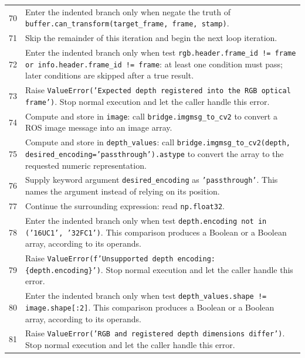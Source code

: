 \documentclass[11pt,a4paper]{book}
\begin{document}
\begin{longtable}{r p{}}
70 & Enter the indented branch only when negate the truth of \texttt{buffer.can\_transform(target\_frame, frame, stamp)}. \\

71 & Skip the remainder of this iteration and begin the next loop iteration. \\

72 & Enter the indented branch only when test \texttt{rgb.header.frame\_id != frame or info.header.frame\_id != frame}: at least one condition must pass; later conditions are skipped after a true result. \\

73 & Raise \texttt{ValueError('Expected depth registered into the RGB optical frame')}. Stop normal execution and let the caller handle this error. \\

74 & Compute and store in \texttt{image}: call \texttt{bridge.imgmsg\_to\_cv2} to convert a ROS image message into an image array.  \\

75 & Compute and store in \texttt{depth\_values}: call \texttt{bridge.imgmsg\_to\_cv2(depth, desired\_encoding='passthrough').astype} to convert the array to the requested numeric representation.  \\

76 & Supply keyword argument \texttt{desired\_encoding} as \texttt{'passthrough'}. This names the argument instead of relying on its position. \\

77 & Continue the surrounding expression: read \texttt{np.float32}. \\

78 & Enter the indented branch only when test \texttt{depth.encoding not in ('16UC1', '32FC1')}. This comparison produces a Boolean or a Boolean array, according to its operands. \\

79 & Raise \texttt{ValueError(f'Unsupported depth encoding: \{depth.encoding\}')}. Stop normal execution and let the caller handle this error. \\

80 & Enter the indented branch only when test \texttt{depth\_values.shape != image.shape[:2]}. This comparison produces a Boolean or a Boolean array, according to its operands. \\

81 & Raise \texttt{ValueError('RGB and registered depth dimensions differ')}. Stop normal execution and let the caller handle this error. \\


\end{longtable}
\end{document}
